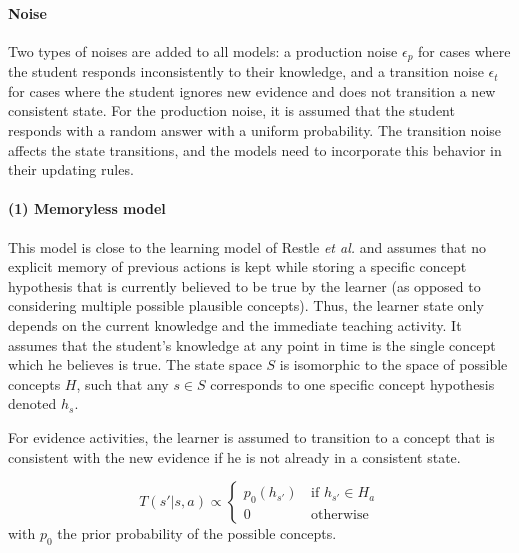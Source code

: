 \paragraph{Noise} Two types of noises are added to all models: a production noise $\epsilon_p$ for cases where the student responds inconsistently to their knowledge, and a transition noise $\epsilon_t$ for cases where the student ignores new evidence and does not transition a new consistent state.
For the production noise, it is assumed that the student responds with a random answer with a uniform probability. 
The transition noise affects the state transitions, and the models need to incorporate this behavior in their updating rules.

\paragraph{(1) Memoryless model}
This model is close to the learning model of Restle \textit{et al.} \cite{restle1962selection} and assumes that no explicit memory of previous actions is kept while storing a specific concept hypothesis that is currently believed to be true by the learner (as opposed to considering multiple possible plausible concepts).
Thus, the learner state only depends on the current knowledge and the immediate teaching activity.
It assumes that the student's knowledge at any point in time is the single concept which he believes is true. 
The state space $S$ is isomorphic to the space of possible concepts $H$, such that any $s\in S$ corresponds to one specific concept hypothesis denoted $h_s$.

For evidence activities, the learner is assumed to transition to a concept that is consistent with the new evidence if he is not already in a consistent state. 

\begin{equation}
    T(s'|s,a) \propto
    \begin{cases}
        p_0(h_{s'}) & \, \text{if $h_{s'} \in H_{a}$} \\
        0       & \, \text{otherwise}
    \end{cases}
\end{equation}
with $p_0$ the prior probability of the possible concepts.

